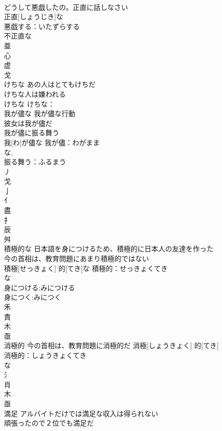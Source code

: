 \documentclass[8pt]{extreport}
\begin{document}
\begin{CJK}{UTF8}{min}
\\	どうして悪戯したの。正直に話しなさい 
\\	正直[しょうじき]な			
\\	悪戯する：いたずらする
\\	不正直な 
\\	亜 
\\	心 
\\	虚 
\\	戈 
\\	けちな	あの人はとてもけちだ 
\\	けちな人は嫌われる 
\\	けちな			けちな：
\\	我が儘な	我が儘な行動 
\\	彼女は我が儘だ 
\\	我が儘に振る舞う 
\\	我[わ]が儘な			我が儘：わがまま
\\	な, 
\\	振る舞う：ふるまう
\\	丿 
\\	戈 
\\	亅 
\\	亻 
\\	盡 
\\	扌 
\\	辰 
\\	舛 
\\	積極的な	日本語を身につけるため、積極的に日本人の友達を作った 
\\	今の首相は、教育問題にあまり積極的ではない 
\\	積極[せっきょく] 的[てき]な			積極的：せっきょくてき
\\	な
\\	身につける:みにつける
\\	身につく:みにつく
\\	禾 
\\	責 
\\	木 
\\	亟 
\\	消極的	今の首相は、教育問題に消極的だ	消極[しょうきょく] 的[てき]	
\\	消極的：しょうきょくてき
\\	な
\\	氵 
\\	肖 
\\	木 
\\	亟 
\\	満足	アルバイトだけでは満足な収入は得られない 
\\	頑張ったので２位でも満足だ 

\end{CJK}
\end{document}
